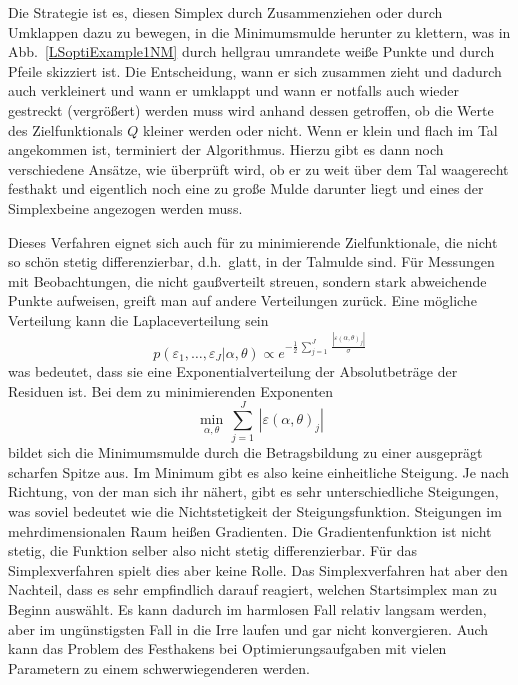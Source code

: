 Die Strategie ist es, diesen Simplex durch Zusammenziehen oder durch Umklappen dazu zu bewegen, in
die Minimumsmulde herunter zu klettern, was in Abb.~\ref{LSoptiExample1NM} durch hellgrau umrandete
weiße Punkte und durch Pfeile skizziert ist. Die Entscheidung, wann er sich zusammen zieht und dadurch
auch verkleinert und wann er umklappt und wann er notfalls auch wieder gestreckt (vergrößert) werden
muss wird anhand dessen getroffen, ob die Werte des Zielfunktionals $Q$ kleiner werden oder nicht.
Wenn er klein und flach im Tal angekommen ist, terminiert der Algorithmus. Hierzu gibt es dann noch
verschiedene Ansätze, wie überprüft wird, ob er zu weit über dem Tal waagerecht festhakt und eigentlich
noch eine zu große Mulde darunter liegt und eines der Simplexbeine angezogen werden muss.

Dieses Verfahren eignet sich auch für zu minimierende Zielfunktionale, die nicht so schön stetig
differenzierbar, d.h.\ glatt, in der Talmulde sind. Für Messungen mit Beobachtungen, die nicht gaußverteilt
streuen, sondern stark abweichende Punkte aufweisen, greift man auf andere Verteilungen zurück.
Eine mögliche Verteilung kann die Laplaceverteilung sein
\begin{equation}
p(\varepsilon_1,\dots,\varepsilon_J | \alpha, \theta)
\propto e^{-\frac{1}{2} \, \sum\limits_{j=1}^J \, \frac{| \varepsilon(\alpha,\theta)_j |}{\sigma} } 
\end{equation}
was bedeutet, dass sie eine Exponentialverteilung der Absolutbeträge der
Residuen ist. Bei dem zu minimierenden Exponenten
\begin{equation}
\min_{\alpha,\theta} \, \sum\limits_{j=1}^J \, | \varepsilon(\alpha,\theta)_j |
\end{equation}
bildet sich die Minimumsmulde durch die Betragsbildung zu einer ausgeprägt scharfen Spitze aus.
Im Minimum gibt es also keine einheitliche Steigung. Je nach Richtung, von der man sich ihr nähert,
gibt es sehr unterschiedliche Steigungen, was soviel bedeutet wie die Nichtstetigkeit der
Steigungsfunktion. Steigungen im mehrdimensionalen Raum heißen Gradienten. Die Gradientenfunktion
ist nicht stetig, die Funktion selber also nicht stetig differenzierbar. Für das Simplexverfahren
spielt dies aber keine Rolle. Das Simplexverfahren hat aber den Nachteil, dass es sehr 
empfindlich darauf reagiert, welchen Startsimplex man zu Beginn auswählt. Es kann dadurch
im harmlosen Fall relativ langsam werden, aber im ungünstigsten Fall in die Irre laufen und gar
nicht konvergieren. Auch kann das Problem des Festhakens bei Optimierungsaufgaben mit vielen
Parametern zu einem schwerwiegenderen werden.

